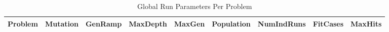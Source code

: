 \begin{table}[H]
\caption{Global Run Parameters Per Problem}
\begin{center}
\scalebox{0.8} %
{
\begin{tabular}{lrrrrrrrr}
\hline
Problem & Mutation & GenRamp & MaxDepth & MaxGen & Population & NumIndRuns & FitCases & MaxHits \\
\hline


\end{tabular}
}
\end{center}
\end{table}

